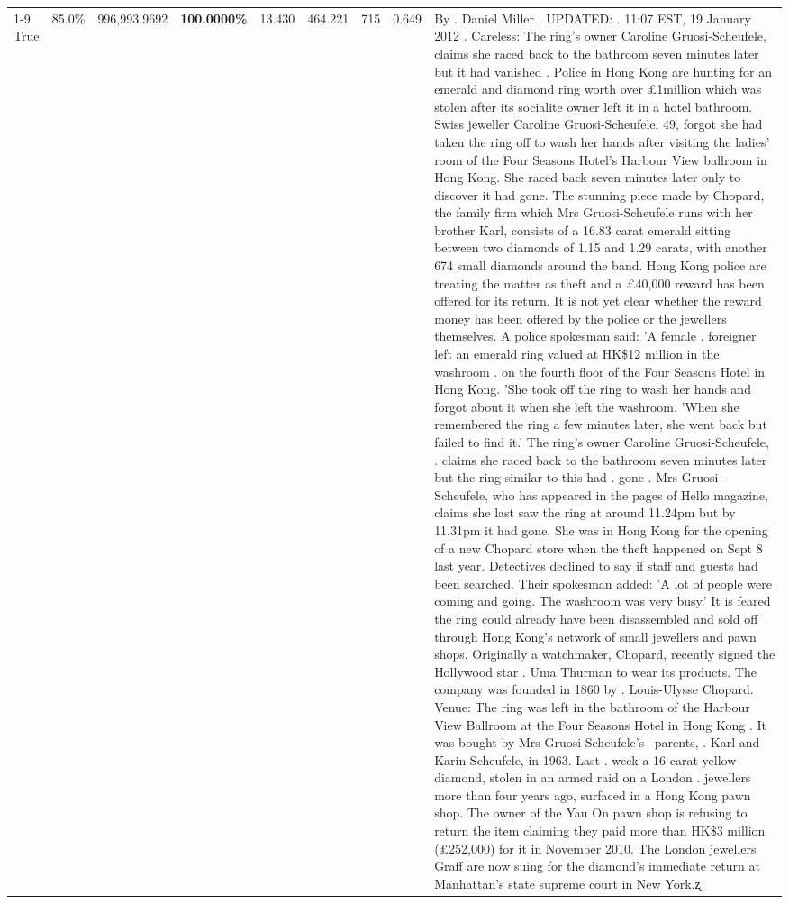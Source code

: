 \begin{table}[H]
\begin{tabular}{lllrlllll}
\cline{1-9}
True & 85.0\% & 996,993.9692 & \bfseries \color{red} 100.0000\% & 13.430 & 464.221 & 715 & 0.649 & By . Daniel Miller . UPDATED: . 11:07 EST, 19 January 2012 . Careless: The ring's owner Caroline Gruosi-Scheufele, claims she raced back to the bathroom seven minutes later but it had vanished . Police in Hong Kong are hunting for an emerald and diamond ring worth over £1million which was stolen after its socialite owner left it in a hotel bathroom. Swiss jeweller Caroline Gruosi-Scheufele, 49, forgot she had taken the ring off to wash her hands after visiting the ladies' room of the Four Seasons Hotel's Harbour View ballroom in Hong Kong. She raced back seven minutes later only to discover it had gone. The stunning piece made by Chopard, the family firm which Mrs Gruosi-Scheufele runs with her brother Karl, consists of a 16.83 carat emerald sitting between two diamonds of 1.15 and 1.29 carats, with another 674 small diamonds around the band. Hong Kong police are treating the matter as theft and a £40,000 reward has been offered for its return. It is not yet clear whether the reward money has been offered by the police or the jewellers themselves. A police spokesman said: 'A female . foreigner left an emerald ring valued at HK\$12 million in the washroom . on the fourth floor of the Four Seasons Hotel in Hong Kong. 'She took off the ring to wash her hands and forgot about it when she left the washroom. 'When she remembered the ring a few minutes later, she went back but failed to find it.' The ring's owner Caroline Gruosi-Scheufele, . claims she raced back to the bathroom seven minutes later but the ring similar to this had . gone . Mrs Gruosi-Scheufele, who has appeared in the pages of Hello magazine, claims she last saw the ring at around 11.24pm but by 11.31pm it had gone. She was in Hong Kong for the opening of a new Chopard store when the theft happened on Sept 8 last year. Detectives declined to say if staff and guests had been searched. Their spokesman added: 'A lot of people were coming and going. The washroom was very busy.' It is feared the ring could already have been disassembled and sold off through Hong Kong's network of small jewellers and pawn shops. Originally a watchmaker, Chopard, recently signed the Hollywood star . Uma Thurman to wear its products. The company was founded in 1860 by . Louis-Ulysse Chopard. Venue: The ring was left in the bathroom of the Harbour View Ballroom at the Four Seasons Hotel in Hong Kong . It was bought by Mrs Gruosi-Scheufele's  parents, . Karl and Karin Scheufele, in 1963. Last . week a 16-carat yellow diamond, stolen in an armed raid on a London . jewellers more than four years ago, surfaced in a Hong Kong pawn shop. The owner of the Yau On pawn shop is refusing to return the item claiming they paid more than HK\$3 million (£252,000) for it in November 2010. The London jewellers Graff are now suing for the diamond’s immediate return at Manhattan’s state supreme court in New York.ʐ \\

\end{tabular}
\end{table}

